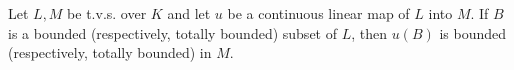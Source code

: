 Let $L, M$ be t.v.s. over $K$ and let $u$ be a continuous linear map of $L$ into $M$. If $B$ is a bounded (respectively, totally bounded) subset of $L$, then $u(B)$ is bounded (respectively, totally bounded) in $M$.
